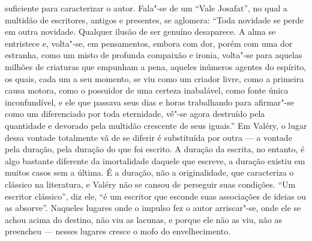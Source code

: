 suficiente para caracterizar o autor. Fala"-se de um ``Vale Josafat'', no
qual a multidão de escritores, antigos e presentes, se aglomera: ``Toda novidade
se perde em outra novidade. Qualquer ilusão de ser genuíno
desaparece. A alma se entristece e, volta"-se, em pensamentos, embora com
dor, porém com uma dor estranha, como um misto de profunda compaixão e ironia,
volta"-se para aquelas milhões de criaturas que empunham a pena, aqueles
inúmeros agentes do espírito, os quais, cada um a seu momento, se viu
como um criador livre, como a primeira causa motora, como o possuidor
de uma certeza inabalável, como fonte única inconfundível, e ele que
passava seus dias e horas trabalhando para afirmar"-se como
um diferenciado por toda eternidade, vê"-se agora destruído
pela quantidade e devorado pela multidão crescente de seus iguais.'' Em
Valéry, o lugar dessa vontade totalmente vã de se diferir é substituída
por outra --- a vontade pela duração, pela duração do que foi escrito. A
duração da escrita, no entanto, é algo bastante diferente da
imortalidade daquele que escreve, a duração existiu em muitos casos sem
a última. É a duração, não a originalidade, que caracteriza o clássico
na literatura, e Valéry não se cansou de perseguir suas condições. ``Um
escritor clássico'', diz ele, ``é um escritor que esconde suas associações
de ideias ou as absorve''. Naqueles lugares onde o impulso fez o autor
arriscar"-se, onde ele se achou acima do destino, não viu as lacunas, e
porque ele não as viu, não as preencheu --- nesses lugares cresce o mofo
do envelhecimento.

